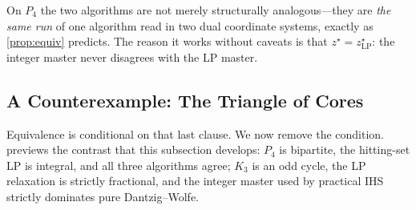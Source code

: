 On $P_4$ the two algorithms are not merely structurally analogous---they are
\emph{the same run} of one algorithm read in two dual coordinate systems,
exactly as \cref{prop:equiv} predicts. The reason it works without
caveats is that $z^\star = z^\star_{\mathrm{LP}}$: the integer master never
disagrees with the LP master.

\subsection{A Counterexample: The Triangle of Cores}
\label{sec:counter}

Equivalence is conditional on that last clause. We now remove the condition.
 previews the contrast that this subsection develops: $P_4$
is bipartite, the hitting-set LP is integral, and all three algorithms agree;
$K_3$ is an odd cycle, the LP relaxation is strictly fractional, and the
integer master used by practical IHS strictly dominates pure Dantzig--Wolfe.

